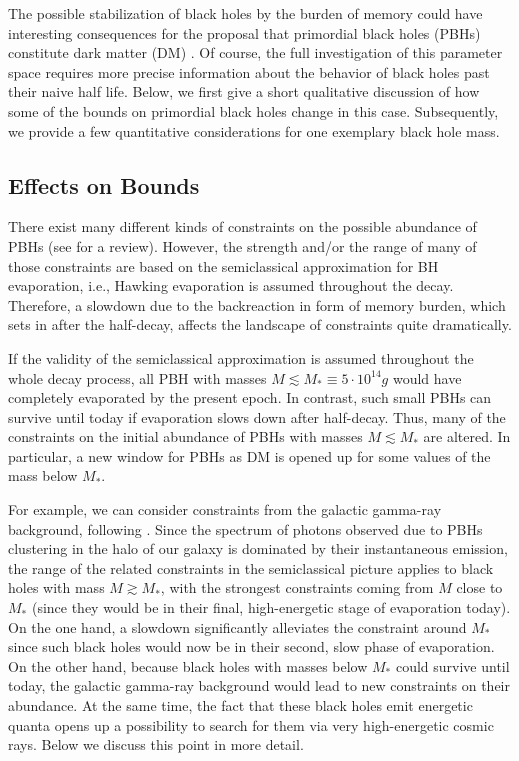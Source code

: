 \documentclass[aps,prd,reprint,superscriptaddress,nofootinbib]{revtex4-2}
\newcommand*{\ie}{i.e., }
\begin{document}
The possible stabilization of black holes by the burden of memory 
could have interesting consequences for the proposal that primordial black holes (PBHs) constitute dark matter (DM) \cite{PBH1,PBH2,PBH3,PBH4}.  Of course, the full investigation
of this parameter space requires more 
precise information about the behavior of black holes past their 
naive half life.  
 Below, we first give a short qualitative discussion of how some of the bounds on primordial black holes change in this case. Subsequently, we provide a few quantitative considerations for one exemplary black hole mass. 



\subsection{Effects on Bounds}

There exist many different kinds of constraints on the possible abundance 
of PBHs (see \cite{1607.06077, 2002.12778} for a review). However, the strength and/or the range of many of those constraints are based on the semiclassical approximation for BH evaporation, \ie Hawking evaporation is assumed throughout the decay. Therefore, a slowdown due to the backreaction in form of memory burden, which sets in after the half-decay, affects the landscape of constraints quite dramatically. 


If the validity of the semiclassical approximation is assumed throughout the whole decay process, all PBH with masses $M \lesssim M_* \equiv 5 \cdot 10^{14}g$ would have completely evaporated by the present epoch\cite{2002.12778}.  In contrast, such small PBHs can survive until today if evaporation slows down after half-decay. Thus, many of the constraints on the 
initial abundance of PBHs with masses $M \lesssim M_*$ are altered. In particular, a new window for PBHs as DM is opened up for some values of the 
mass below $M_*$.

For example, we can consider constraints from the galactic gamma-ray background,
following \cite{1604.05349}. 
Since the spectrum of photons observed due to PBHs clustering in the halo 
of our galaxy is dominated by their instantaneous emission, the range of the related constraints in the semiclassical picture applies to black holes with mass $M\gtrsim M_*$, with the strongest constraints coming from $M$ close to $M_*$ (since they would be in their final, high-energetic stage of evaporation today).
On the one hand, a slowdown significantly alleviates the constraint around $M_*$ since such black holes would now be in their second, slow phase of evaporation. On the other hand, because black holes with masses below $M_*$ could survive until today, the galactic gamma-ray background would lead to new constraints on their abundance. At the same time, the fact that these black holes emit energetic quanta opens up a possibility to search for them via very high-energetic cosmic rays. Below we discuss this point in more detail. 
\end{document}
